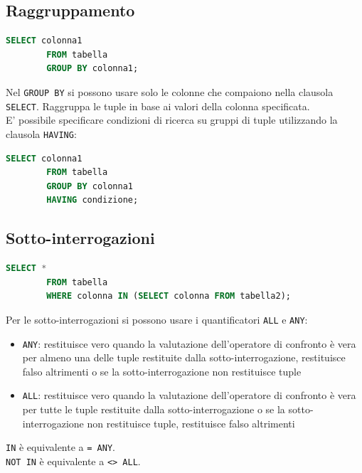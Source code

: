 \documentclass[12pt, a4paper]{report}
\begin{document}
    \subsection{Raggruppamento}
    \begin{lstlisting}[language=SQL]
        SELECT colonna1
        FROM tabella
        GROUP BY colonna1;
    \end{lstlisting}
    Nel \texttt{GROUP BY} si possono usare solo le colonne che compaiono nella clausola \texttt{SELECT}. Raggruppa le tuple in base ai valori della colonna specificata.\\
    E' possibile specificare condizioni di ricerca su gruppi di tuple utilizzando la clausola \texttt{HAVING}:
    \begin{lstlisting}[language=SQL]
        SELECT colonna1
        FROM tabella
        GROUP BY colonna1
        HAVING condizione;
    \end{lstlisting}
    \subsection{Sotto-interrogazioni}
    \begin{lstlisting}[language=SQL]
        SELECT *
        FROM tabella
        WHERE colonna IN (SELECT colonna FROM tabella2);
    \end{lstlisting}
    Per le sotto-interrogazioni si possono usare i quantificatori \texttt{ALL} e \texttt{ANY}:
    \begin{itemize}
        \item \texttt{ANY}: restituisce vero quando la valutazione dell'operatore di confronto è vera per almeno una delle tuple restituite dalla sotto-interrogazione, restituisce falso altrimenti o se la sotto-interrogazione non restituisce tuple
        \item \texttt{ALL}: restituisce vero quando la valutazione dell'operatore di confronto è vera per tutte le tuple restituite dalla sotto-interrogazione  o se la sotto-interrogazione non restituisce tuple, restituisce falso altrimenti
    \end{itemize}
    \texttt{IN} è equivalente a \texttt{= ANY}.\\
    \texttt{NOT IN} è equivalente a \texttt{<> ALL}.\\
\end{document}
